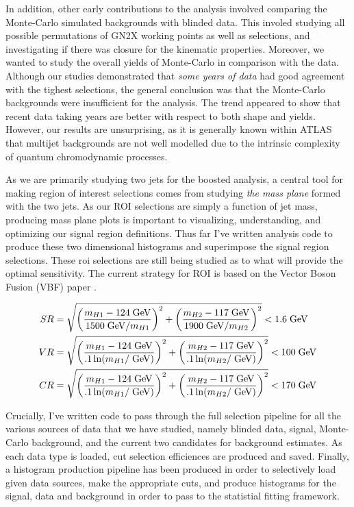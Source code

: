 \documentclass[12pt]{article}
\begin{document}
In addition, other early contributions to the analysis involved comparing the
Monte-Carlo simulated backgrounds with blinded data. This involed studying all
possible permutations of GN2X working points as well as selections, and
investigating if there was closure for the kinematic properties. Moreover, we
wanted to study the overall yields of Monte-Carlo in comparison with the data. Although our
studies demonstrated that \textit{some years of data} had good agreement with
the tighest selections, the general conclusion was that the Monte-Carlo
backgrounds were insufficient for the analysis. The trend appeared to show that
recent data taking years are better with respect to both shape and yields.
However, our results are unsurprising, as it is generally known within ATLAS
that multijet backgrounds are not well modelled due to the intrinsic
complexity of quantum chromodynamic processes.

As we are primarily studying two jets for the boosted analysis, a central tool
for making region of interest selections comes from studying \textit{the mass
plane} formed with the two jets. As our ROI selections are simply a function of
jet mass, producing mass plane plots is important to visualizing, understanding,
and optimizing our signal region definitions. Thus far I've written analysis
code to produce these two dimensional histograms and superimpose the signal
region selections. These roi selections are still being studied as to what will
provide the optimal sensitivity. The current strategy for ROI is based on the
Vector Boson Fusion (VBF) paper \cite{atlas_hhbbbb_vbf}.

\begin{align}
    SR &= \sqrt{\left( \frac{m_{H1}-124\;\text{GeV}}{1500\;\text{GeV}/m_{H1}}
    \right)^2 + \left( \frac{m_{H2}-117\;\text{GeV}}{1900\;\text{GeV}/m_{H2}}
    \right)^2} < 1.6 \;\text{GeV} \\
    VR &= \sqrt{\left( \frac{m_{H1}-124\;\text{GeV}}{.1\ln(m_{H1}/\;\text{GeV})}
    \right)^2 + \left( \frac{m_{H2}-117\;\text{GeV}}{.1\ln(m_{H2}/\;\text{GeV})}
    \right)^2} < 100 \;\text{GeV} \\
    CR &= \sqrt{\left( \frac{m_{H1}-124\;\text{GeV}}{.1\ln(m_{H1}/\;\text{GeV})}
    \right)^2 + \left( \frac{m_{H2}-117\;\text{GeV}}{.1\ln(m_{H2}/\;\text{GeV})}
    \right)^2} < 170 \;\text{GeV}
\end{align}

Crucially, I've written code to pass through the full selection pipeline for all
the various sources of data that we have studied, namely blinded data, signal,
Monte-Carlo background, and the current two candidates for background estimates.
As each data type is loaded, cut selection efficiences are produced and saved.
Finally, a histogram production pipeline has been produced in order to
selectively load given data sources, make the appropriate cuts, and produce
histograms for the signal, data and background in order to pass to the
statistial fitting framework. %
\end{document}
